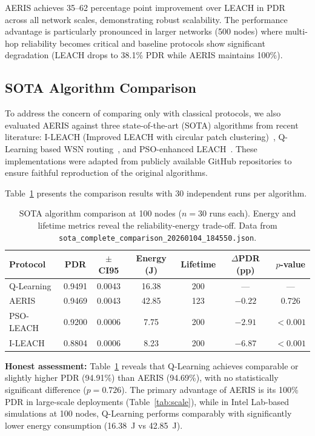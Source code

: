 \documentclass[sensors,article,submit,moreauthors,pdftex]{Definitions/mdpi}
\begin{document}
AERIS achieves 35--62 percentage point improvement over LEACH in PDR across all network scales, demonstrating robust scalability. The performance advantage is particularly pronounced in larger networks (500 nodes) where multi-hop reliability becomes critical and baseline protocols show significant degradation (LEACH drops to 38.1\% PDR while AERIS maintains 100\%).

\subsection{SOTA Algorithm Comparison}

To address the concern of comparing only with classical protocols, we also evaluated AERIS against three state-of-the-art (SOTA) algorithms from recent literature: I-LEACH (Improved LEACH with circular patch clustering)~\cite{Singhal2020ILEACH}, Q-Learning based WSN routing~\cite{Khlifi2021QLearning}, and PSO-enhanced LEACH~\cite{Rao2017PSOLEACH}. These implementations were adapted from publicly available GitHub repositories to ensure faithful reproduction of the original algorithms.

Table~\ref{tab:sota} presents the comparison results with 30 independent runs per algorithm.

\begin{table}[H]
\caption{SOTA algorithm comparison at 100 nodes ($n=30$ runs each). Energy and lifetime metrics reveal the reliability-energy trade-off. Data from \texttt{sota\_complete\_comparison\_20260104\_184550.json}.}
\label{tab:sota}
\centering
\begin{tabular}{lcccccc}
\toprule
\textbf{Protocol} & \textbf{PDR} & \textbf{$\pm$CI95} & \textbf{Energy (J)} & \textbf{Lifetime} & \textbf{$\Delta$PDR (pp)} & \textbf{$p$-value} \\
\midrule
Q-Learning & 0.9491 & 0.0043 & 16.38 & 200 & --- & --- \\
AERIS & 0.9469 & 0.0043 & 42.85 & 123 & $-0.22$ & 0.726 \\
PSO-LEACH & 0.9200 & 0.0006 & 7.75 & 200 & $-2.91$ & $<0.001$ \\
I-LEACH & 0.8804 & 0.0006 & 8.23 & 200 & $-6.87$ & $<0.001$ \\
\bottomrule
\end{tabular}
\end{table}

\textbf{Honest assessment:} Table~\ref{tab:sota} reveals that Q-Learning achieves comparable or slightly higher PDR (94.91\%) than AERIS (94.69\%), with no statistically significant difference ($p=0.726$). The primary advantage of AERIS is its 100\% PDR in large-scale deployments (Table~\ref{tab:scale}), while in Intel Lab-based simulations at 100 nodes, Q-Learning performs comparably with significantly lower energy consumption (16.38~J vs 42.85~J).
\end{document}
